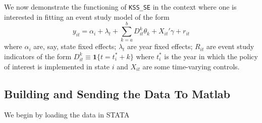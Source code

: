 \documentclass[11pt]{article}
\begin{document}
We now demonstrate the functioning of  \texttt{KSS\_SE} in the context where one is interested in fitting an event study model of the form
\begin{equation}
\label{ES}
y_{it} = \alpha_{i} + \lambda_{t} + \sum_{k=a}^{b}D_{it}^{k}\theta_{k}+X_{it}'\gamma + r_{it}
\end{equation}
where $\alpha_{i}$ are, say, state fixed effects; $\lambda_{t}$ are year fixed effects; $R_{it}$ are event study indicators of the form $D_{it}^{k}\equiv \mathbf{1}\{t=t_{i}^{*}+k\}$ where $t_{i}^{*}$ is the year in which the policy of interest is implemented in state $i$ and $X_{it}$ are some time-varying controls. 

\hypertarget{setup}{%
\subsection{Building and Sending the Data To Matlab}\label{setup}}
We begin by loading the data in STATA
\end{document}
